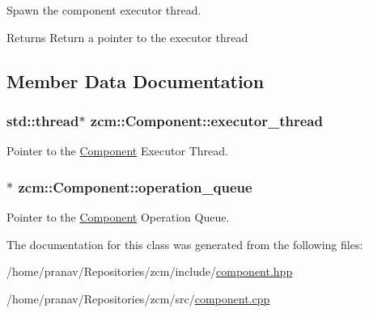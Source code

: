 Spawn the component executor thread. 

\begin{DoxyReturn}{Returns}
Return a pointer to the executor thread 
\end{DoxyReturn}


\subsection{Member Data Documentation}
\subsubsection[{\texorpdfstring{executor\+\_\+thread}{executor_thread}}]{\setlength{\rightskip}{0pt plus 5cm}std\+::thread$\ast$ zcm\+::\+Component\+::executor\+\_\+thread\hspace{0.3cm}{\ttfamily [protected]}}\hypertarget{classzcm_1_1Component_a392ca3b6cd537cd7aa1d4db31dacdf4d}{}\label{classzcm_1_1Component_a392ca3b6cd537cd7aa1d4db31dacdf4d}


Pointer to the \hyperlink{classzcm_1_1Component}{Component} Executor Thread. 

\subsubsection[{\texorpdfstring{operation\+\_\+queue}{operation_queue}}]{$\ast$ zcm\+::\+Component\+::operation\+\_\+queue\hspace{0.3cm}{\ttfamily [protected]}}\hypertarget{classzcm_1_1Component_a4c9f3591c18dde89bc3c2af7717c6692}{}\label{classzcm_1_1Component_a4c9f3591c18dde89bc3c2af7717c6692}


Pointer to the \hyperlink{classzcm_1_1Component}{Component} Operation Queue. 



The documentation for this class was generated from the following files\+:\begin{DoxyCompactItemize}
\item 
/home/pranav/\+Repositories/zcm/include/\hyperlink{component_8hpp}{component.\+hpp}\item 
/home/pranav/\+Repositories/zcm/src/\hyperlink{component_8cpp}{component.\+cpp}\end{DoxyCompactItemize}
